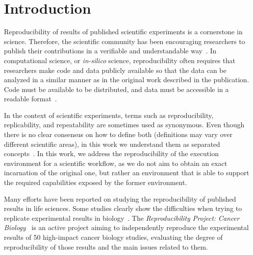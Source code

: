 \section{Introduction}


Reproducibility of results of published scientific experiments is a cornerstone in 
science. Therefore, the scientific community has been encouraging researchers 
to publish their contributions in a verifiable and understandable 
way~\cite{YaleRoundtable09, James-XSEDE-2014}. In computational science, 
or \emph{in-silico} science, reproducibility often requires that researchers make 
code and data publicly available so that the data can be analyzed in a similar 
manner as in the original work described in the publication. Code must be available 
to be distributed, and data must be accessible in a readable format~\cite{bookReproducibility}. 

In the context of scientific experiments, terms such as reproducibility, replicability, and repeatability are sometimes used as synonymous. Even though there is no clear consensus on how to define both (definitions may vary over different scientific areas), in this work we understand them as separated concepts~\cite{Drummond2011}. In this work, we address the reproducibility of the execution environment for a scientific workflow, as we do not aim to obtain an exact incarnation of the original one, but rather an environment that is able to support the required capabilities exposed by the former environment.

Many efforts have been reported on studying the reproducibility of published results in life sciences. Some studies clearly show the difficulties when trying to  replicate experimental results in biology~\cite{Ioannidis2009}. The {\it Reproducibility Project: Cancer Biology}~\cite{ErringtonCancerRerpoducibility} is an active project aiming to independently reproduce the experimental results of 50 high-impact cancer biology studies, evaluating the degree of reproducibility of those results and the main issues related to them.

